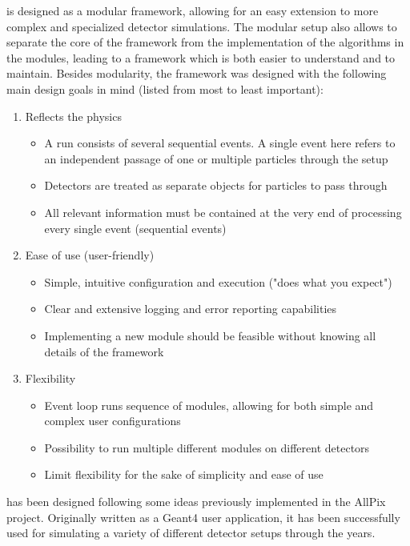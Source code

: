 \apsq is designed as a modular framework, allowing for an easy extension to more complex and specialized detector simulations.
The modular setup also allows to separate the core of the framework from the implementation of the algorithms in the modules, leading to a framework which is both easier to understand and to maintain.
Besides modularity, the \apsq framework was designed with the following main design goals in mind (listed from most to least important):
\begin{enumerate}
    \item Reflects the physics
    \begin{itemize}
        \item A run consists of several sequential events. A single event here refers to an independent passage of one or multiple particles through the setup
        \item Detectors are treated as separate objects for particles to pass through
        \item All relevant information must be contained at the very end of processing every single event (sequential events)
    \end{itemize}
    \item Ease of use (user-friendly)
    \begin{itemize}
        \item Simple, intuitive configuration and execution ("does what you expect")
        \item Clear and extensive logging and error reporting capabilities
        \item Implementing a new module should be feasible without knowing all details of the framework
    \end{itemize}
    \item Flexibility
    \begin{itemize}
        \item Event loop runs sequence of modules, allowing for both simple and complex user configurations
        \item Possibility to run multiple different modules on different detectors
        \item Limit flexibility for the sake of simplicity and ease of use
    \end{itemize}
\end{enumerate}

\apsq has been designed following some ideas previously implemented in the AllPix~\cite{ap1wiki,ap1git} project.
Originally written as a Geant4 user application, it has been successfully used for simulating a variety of different detector setups through the years.

